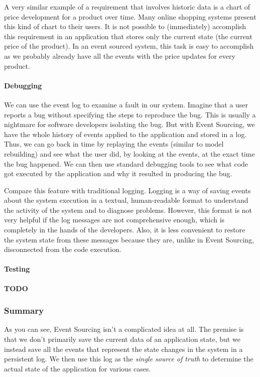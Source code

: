 \documentclass{book}
\begin{document}
A very similar example of a requirement that involves historic data is a
chart of price development for a product over time. Many online shopping
systems present this kind of chart to their users. It is not possible to
(immediately) accomplish this requirement in an application that stores
only the current state (the current price of the product). In an event
sourced system, this task is easy to accomplish as we probably already
have all the events with the price updates for every product.

\paragraph{Debugging}\label{debugging}

We can use the event log to examine a fault in our system. Imagine that
a user reports a bug without specifying the steps to reproduce the bug.
This is usually a nightmare for software developers isolating the bug.
But with Event Sourcing, we have the whole history of events applied to
the application and stored in a log. Thus, we can go back in time by
replaying the events (similar to model rebuilding) and see what the user
did, by looking at the events, at the exact time the bug happened. We
can then use standard debugging tools to see what code got executed by
the application and why it resulted in producing the bug.

Compare this feature with traditional logging. Logging is a way of
saving events about the system execution in a textual, human-readable
format to understand the activity of the system and to diagnose
problems. However, this format is not very helpful if the log messages
are not comprehensive enough, which is completely in the hands of the
developers. Also, it is less convenient to restore the system state from
these messages because they are, unlike in Event Sourcing, disconnected
from the code execution.

\paragraph{Testing}\label{testing}

\textbf{TODO}

\subsubsection{Summary}\label{summary}

As you can see, Event Sourcing isn't a complicated idea at all. The
premise is that we don't primarily save the current data of an
application state, but we instead save all the events that represent the
state changes in the system in a persistent log. We then use this log as
the \emph{single source of truth} to determine the actual state of the
application for various cases.
\end{document}
